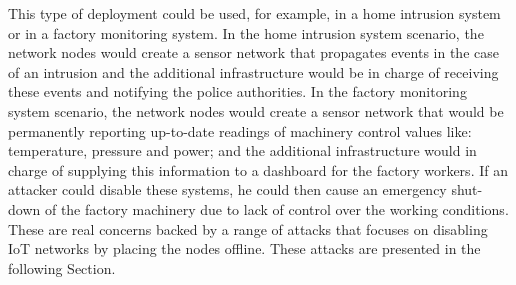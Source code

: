 This type of deployment could be used, for example, in a home intrusion system or in a factory monitoring system. 
In the home intrusion system scenario, the network nodes would create a sensor network that propagates events in the case of an intrusion and the additional infrastructure would be in charge of receiving these events and notifying the police authorities. 
In the factory monitoring system scenario, the network nodes would create a sensor network that would be permanently reporting up-to-date readings of machinery control values like: temperature, pressure and power; 
and the additional infrastructure would in charge of supplying this information to a dashboard for the factory workers. 
If an attacker could disable these systems, he could then 
cause an emergency shut-down of the factory machinery due to lack of control over the working conditions. 
These are real concerns backed by a range of attacks that focuses on disabling \gls{IoT} networks by placing the nodes offline. These attacks are presented in the following Section.